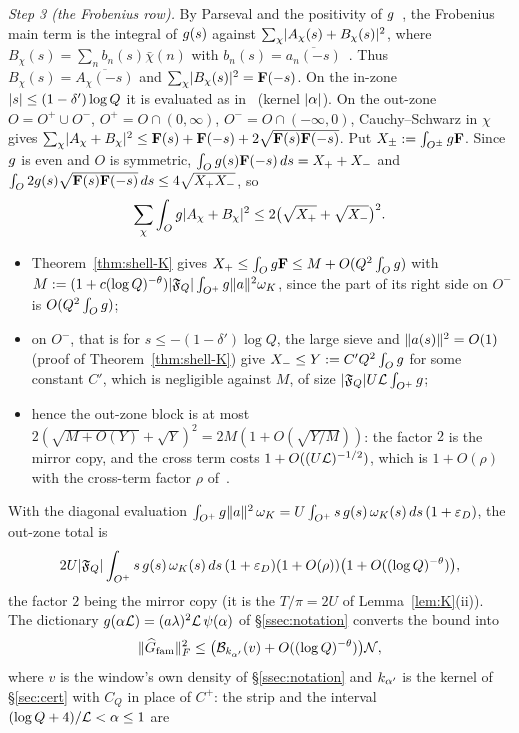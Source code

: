 \emph{Step 3 (the Frobenius row).} By Parseval and the positivity of $g$~\cite[Lemmas~4.1, 4.2]{DSouza}, the Frobenius main term is the integral of
$g(s)$ against $\sum_\chi\lvert A_\chi(s)+B_\chi(s)\rvert^2$, where $B_\chi(s)=\sum_nb_n(s)\bar\chi(n)$ with $b_n(s)=\overline{a_n(-s)}$~\cite[Lemma~4.3]{DSouza}. Thus
$B_\chi(s)=\overline{A_\chi(-s)}$ and $\sum_\chi\lvert B_\chi(s)\rvert^2=\mathbf F(-s)$. On the in-zone $\lvert s\rvert\le(1-\delta')\log Q$ it is evaluated as in~\cite[\S\S4--5]{DSouza}
(kernel $\lvert \alpha\rvert$). On the out-zone $O=O^+\cup O^-$, $O^+=O\cap(0,\infty)$, $O^-=O\cap(-\infty,0)$, Cauchy--Schwarz in $\chi$ gives
$\sum_\chi\lvert A_\chi+B_\chi\rvert^2\le\mathbf F(s)+\mathbf F(-s)+2\sqrt{\mathbf F(s)\mathbf F(-s)}$. Put $X_\pm:=\int_{O^\pm}g\mathbf F$. Since $g$ is even and $O$ is
symmetric, $\int_Og(s)\mathbf F(-s)\,ds=X_++X_-$ and $\int_O2g(s)\sqrt{\mathbf F(s)\mathbf F(-s)}\,ds\le4\sqrt{X_+X_-}$, so
\[
\sum_\chi\int_Og\lvert A_\chi+B_\chi\rvert^2\le2\bigl(\sqrt{X_+}+\sqrt{X_-}\bigr)^2 .
\]
\begin{itemize}
\item Theorem~\ref{thm:shell-K} gives $X_+\le\int_Og\mathbf F\le M+O(Q^2\int_Og)$ with $M:=(1+c(\log Q)^{-\theta})\lvert \mathfrak F_Q\rvert\int_{O^+}g\lVert a\rVert^2\omega_K$,
since the part of its right side on $O^-$ is $O(Q^2\int_Og)$;
\item on $O^-$, that is for $s\le-(1-\delta')\log Q$, the large sieve and $\lVert a(s)\rVert^2=O(1)$ (proof of Theorem~\ref{thm:shell-K}) give $X_-\le Y:=C'Q^2\int_Og$ for some constant $C'$,
which is negligible against $M$, of size $\lvert \mathfrak F_Q\rvert U\mathcal L\int_{O^+}g$;
\item hence the out-zone block is at most $2(\sqrt{M+O(Y)}+\sqrt Y)^2=2M(1+O(\sqrt{Y/M}))$: the factor $2$ is the mirror copy, and the cross term costs $1+O((U\mathcal L)^{-1/2})$, which is
$1+O(\rho)$ with the cross-term factor $\rho$ of~\cite[Lemma~4.3]{DSouza}.
\end{itemize}
With the diagonal evaluation $\int_{O^+}g\lVert a\rVert^2\,\omega_K=U\int_{O^+}s\,g(s)\,\omega_K(s)\,ds\,(1+\varepsilon_D)$, the out-zone total is
\[
2U\lvert \mathfrak F_Q\rvert\int_{O^+}s\,g(s)\,\omega_K(s)\,ds\,(1+\varepsilon_D)(1+O(\rho))\bigl(1+O((\log Q)^{-\theta})\bigr),
\]
the factor $2$ being the mirror copy (it is the $T/\pi=2U$ of Lemma~\ref{lem:K}(ii)). The dictionary $g(\alpha\mathcal L)=(a\lambda)^2\mathcal L\,\psi(\alpha)$ of \S\ref{ssec:notation} converts the bound into
\[
\lVert \widehat G_{\rm fam}\rVert_F^2\le\bigl(\mathcal B_{k_{\alpha'}}(v)+O((\log Q)^{-\theta})\bigr)\mathcal N,
\]
where $v$ is the window's own density of \S\ref{ssec:notation} and $k_{\alpha'}$ is the kernel of \S\ref{sec:cert} with $C_Q$ in place of $C^+$: the strip and the interval $(\log Q+4)/\mathcal L<\alpha\le1$ are
